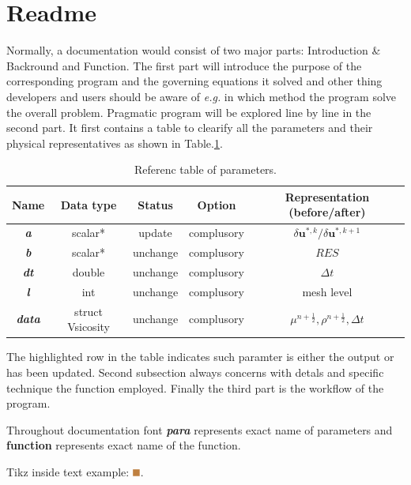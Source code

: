 \documentclass[a4paper]{article}
\newcommand{\func}[1]{\textbf{\textcolor{function}{#1}}}
\newcommand{\para}[1]{\textbf{\emph{\textcolor{para}{#1}}}}
\newcommand{\testA}{\tikz \fill[brown] (2pt,2pt) rectangle (8pt,8pt);}
\begin{document}
\section{Readme}
Normally, a documentation would consist of two major parts: Introduction \& Backround and Function. The first part will introduce the purpose of the corresponding program and the governing equations it solved and other thing developers and users should be aware of \emph{e.g.} in which method the program solve the overall problem. Pragmatic program will be explored line by line in the second part. It first contains a table to clearify all the parameters and their physical representatives as shown in Table.\ref{tab:test}. 
\begin{table}[h]
  \centering
  \begin{tabular}{|c|c|c|c|c|}
    \hline
    Name & Data type & Status & Option & Representation (before/after)\\[0.5ex]
    \hline\hline
    \rowcolor{output} \para{a} & scalar* & update & complusory & $\delta \mathbf{u}^{*,k}/\delta \mathbf{u}^{*,k+1}$\\
    \hline
    \para{b} & scalar* & unchange & complusory & $RES$\\
    \hline
    \para{dt} & double & unchange & complusory & $\Delta t$\\
    \hline
    \para{l} & int & unchange & complusory &  mesh level \\
    \hline
    \para{data} & struct Vsicosity & unchange & complusory & $\mu^ {n+\frac{1}{2}}, \rho^{n+\frac{1}{2}}, \Delta t$ \\
    \hline
  \end{tabular}
  \caption{Referenc table of parameters.}
  \label{tab:test}
\end{table}
The highlighted row in the table indicates such paramter is either the output or has been updated. Second subsection always concerns with detals and specific technique the function employed. Finally the third part is the workflow of the program.\par
Throughout documentation font \para{para} represents exact name of parameters and \func{function} represents exact name of the function.

Tikz inside text example: $\testA$.
\end{document}
